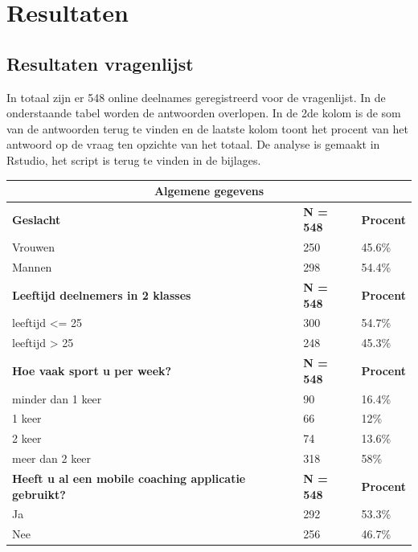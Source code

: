 \chapter{Resultaten}
\label{ch:resultaten}

\section{Resultaten vragenlijst}
\label{sec:Resultaten vragenlijst}
In totaal zijn er 548 online deelnames geregistreerd voor de vragenlijst. In de onderstaande tabel worden de antwoorden overlopen. In de 2de kolom is de som van de antwoorden terug te vinden en de laatste kolom toont het procent van het antwoord op de vraag ten opzichte van het totaal. De analyse is gemaakt in Rstudio, het script is terug te vinden in de bijlages.
\begin{table}[h!]
\begin{center}
\begin{tabular}{ |p{10cm}|p{2cm}|p{2cm}| }
 \hline
 \multicolumn{3}{|c|}{Algemene gegevens} \\
 \hline
 \textbf{Geslacht} & \textbf{N = 548} &\textbf{Procent}\\ 
 \hline
 Vrouwen   & 250    &45.6\%   \\
 Mannen &   298  &54.4\%   \\
 \hline
 \textbf{Leeftijd deelnemers in 2 klasses} & \textbf{N = 548} &\textbf{Procent}\\ 
 \hline
 leeftijd <= 25   & 300    &54.7\%   \\
 leeftijd > 25 &   248  &45.3\%   \\
 \hline
  \textbf{Hoe vaak sport u per week? } & \textbf{N = 548} &\textbf{Procent}\\ 
 \hline
 minder dan 1 keer   & 90    &16.4\%   \\
 1 keer &   66  &12\%   \\
 2 keer &   74  &13.6\%   \\
meer dan 2 keer &   318 &58\%   \\
 \hline
     \textbf{Heeft u al een mobile coaching applicatie gebruikt?} & \textbf{N = 548} &\textbf{Procent}\\ 
 \hline
Ja   & 292    &53.3\%   \\
Nee &   256  &46.7\%   \\
  \hline
\end{tabular}
\end{center}
\end{table}

